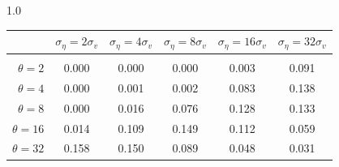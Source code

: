 \documentclass[12pt]{article}
\begin{document}
\begin{table}[h!]
\vspace{10pt}
\begin{subtable}{1.0\textwidth}
    \centering
\begin{tabular}{rccccc}
\hline  
            & \multicolumn{1}{l}{$\sigma_{\eta} =2\sigma_{v}$} & \multicolumn{1}{l}{$\sigma_{\eta} =4\sigma_{v}$} & \multicolumn{1}{l}{$\sigma_{\eta} =8\sigma_{v}$} & \multicolumn{1}{l}{$\sigma_{\eta} =16\sigma_{v}$} & \multicolumn{1}{l}{$\sigma_{\eta} =32\sigma_{v}$} \\ \hline  \vspace{-3mm} \\        
$\theta=2$  & 0.000                                             & 0.000                                             & 0.000                                             & 0.003                                              & 0.091                                              \\ \hline
$\theta=4$  & 0.000                                             & 0.001                                             & 0.002                                             & 0.083                                              & 0.138                                              \\ \hline
$\theta=8$  & 0.000                                             & 0.016                                             & 0.076                                             & 0.128                                              & 0.133                                              \\ \hline
$\theta=16$ & 0.014                                             & 0.109                                             & 0.149                                             & 0.112                                              & 0.059                                              \\ \hline
$\theta=32$ & 0.158                                             & 0.150                                             & 0.089                                             & 0.048                                              & 0.031                                              \\ \hline
\end{tabular}
\end{subtable}


\end{table}
\end{document}
